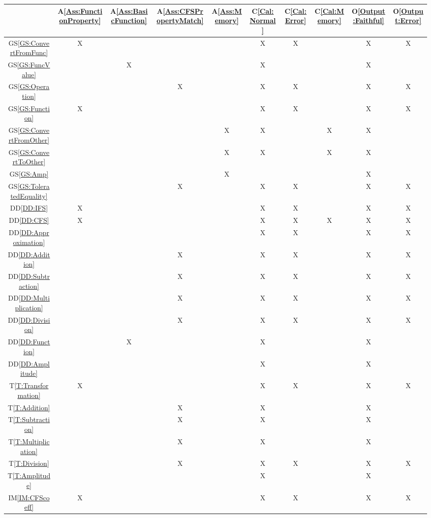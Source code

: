 \documentclass[12pt]{article}
\newcommand{\ddref}[1]{DD\ref{#1}}
\newcommand{\tref}[1]{T\ref{#1}}
\newcommand{\aref}[1]{A\ref{#1}}
\newcommand{\calref}[1]{C\ref{#1}}
\newcommand{\oref}[1]{O\ref{#1}}
\newcommand{\gsref}[1]{GS\ref{#1}}
\newcommand{\iref}[1]{IM\ref{#1}}
\begin{document}
\begin{table}
	\centering
	\begin{tabular}{|c|c|c|c|c|c|c|c|c|c|}
		\hline
		&\aref{Ass:FunctionProperty}&\aref{Ass:BasicFunction}
		&\aref{Ass:CFSPropertyMatch}&\aref{Ass:Memory}
		&\calref{Cal:Normal}&\calref{Cal:Error}
		&\calref{Cal:Memory}&\oref{Output:Faithful}
		&\oref{Output:Error}\\
		\hline
		\gsref{GS:ConvertFromFunc}
		&X& & & &X&X&  &X&X\\\hline
		\gsref{GS:FuncValue}
		& &X& & &X& & &X& \\\hline
		\gsref{GS:Operation}
		& & &X& &X&X& &X&X \\\hline
		\gsref{GS:Function}
		&X& & & &X&X& &X&X\\\hline
		\gsref{GS:ConvertFromOther}
		& & & &X&X& &X&X& \\\hline
		\gsref{GS:ConvertToOther}
		& & & &X&X& &X&X& \\\hline
		\gsref{GS:Amp}
		& & & &X& & & &X& \\\hline
		\gsref{GS:ToleratedEquality}
		& & &X& &X&X& &X&X\\\hline
		\ddref{DD:IFS}
		&X& & & &X&X& &X&X\\\hline
		\ddref{DD:CFS}
		&X& & & &X&X&X&X&X\\\hline
		\ddref{DD:Approximation}
		& & & & &X&X& &X&X\\\hline
		\ddref{DD:Addition}
		& & &X& &X&X& &X&X\\\hline
		\ddref{DD:Subtraction}
		& & &X& &X&X& &X&X\\\hline
		\ddref{DD:Multiplication}
		& & &X& &X&X& &X&X\\\hline
		\ddref{DD:Division}
		& & &X& &X&X& &X&X\\\hline
		\ddref{DD:Function}
		& &X& & &X& & &X& \\\hline
		\ddref{DD:Amplitude}
		& & & & &X& & &X& \\\hline
		\tref{T:Transformation}
		&X& & & &X&X& &X&X\\\hline
		\tref{T:Addition}
		& & &X& &X& & &X& \\\hline
		\tref{T:Subtraction}
		& & &X& &X& & &X& \\\hline
		\tref{T:Multiplication}
		& & &X& &X& & &X& \\\hline
		\tref{T:Division}
		& & &X& &X&X& &X&X\\\hline
		\tref{T:Amplitude}
		& & & & &X& & &X& \\\hline
		\iref{IM:CFScoeff}
		&X& & & &X&X& &X&X\\\hline

\end{tabular}
\end{table}
\end{document}
